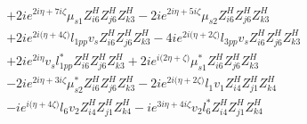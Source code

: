 \begin{align}
 &+2 i e^{2 i \eta +7 i \zeta } \mu_{s1} Z_{{i 6}}^{H} Z_{{j 6}}^{H} Z_{{k 3}}^{H} -2 i e^{2 i \eta +5 i \zeta } \mu_{s2} Z_{{i 6}}^{H} Z_{{j 6}}^{H} Z_{{k 3}}^{H} \nonumber \\ 
 &+2 i e^{2 i \Big(\eta +4 \zeta \Big)} l_{1pp} v_s Z_{{i 6}}^{H} Z_{{j 6}}^{H} Z_{{k 3}}^{H} -4 i e^{2 i \Big(\eta +2 \zeta \Big)} l_{3pp} v_s Z_{{i 6}}^{H} Z_{{j 6}}^{H} Z_{{k 3}}^{H} \nonumber \\ 
 &+2 i e^{2 i \eta } v_s l_{1pp}^* Z_{{i 6}}^{H} Z_{{j 6}}^{H} Z_{{k 3}}^{H} +2 i e^{i \Big(2 \eta +\zeta \Big)} \mu_{s1}^* Z_{{i 6}}^{H} Z_{{j 6}}^{H} Z_{{k 3}}^{H} \nonumber \\ 
 &-2 i e^{2 i \eta +3 i \zeta } \mu_{s2}^* Z_{{i 6}}^{H} Z_{{j 6}}^{H} Z_{{k 3}}^{H} -2 i e^{2 i \Big(\eta +2 \zeta \Big)} l_1 v_1 Z_{{i 4}}^{H} Z_{{j 1}}^{H} Z_{{k 4}}^{H} \nonumber \\ 
 &-i e^{i \Big(\eta +4 \zeta \Big)} l_6 v_2 Z_{{i 4}}^{H} Z_{{j 1}}^{H} Z_{{k 4}}^{H} -i e^{3 i \eta +4 i \zeta } v_2 l_6^* Z_{{i 4}}^{H} Z_{{j 1}}^{H} Z_{{k 4}}^{H} \nonumber 
\end{align} 
